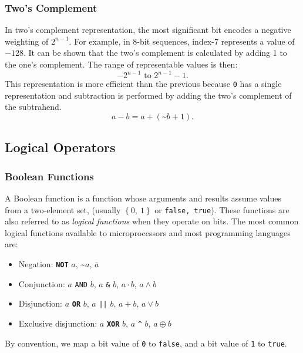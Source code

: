 \documentclass{article}
\newcommand{\keywordinline}[1]{\textcolor[rgb]{0.00,0.50,0.00}{\textbf{\texttt{#1}}}}
\begin{document}
\subsubsection{Two's Complement}
In two's complement representation, the most significant bit encodes a
negative weighting of \(2^{n - 1}\). For example, in 8-bit sequences,
index-7 represents a value of \(-128\). It can be shown that the two's
complement is calculated by adding 1 to the one's complement. The range
of representable values is then:
\begin{equation*}
    -2^{n - 1} \text{ to } 2^{n - 1} - 1.
\end{equation*}
This representation is more efficient than the previous because \texttt{0} has a single representation
and subtraction is performed by adding the two's complement of the subtrahend.
\begin{equation*}
    a - b = a + \left( \text{\textasciitilde} b + 1 \right).
\end{equation*}
\subsection{Logical Operators}
\subsubsection{Boolean Functions}
A Boolean function is a function whose arguments and results assume
values from a two-element set, (usually \(\left\{ 0,\: 1 \right\}\) or
\texttt{{false, true}}). These functions are also referred to
as \textit{logical functions} when they operate on bits. The most
common logical functions available to microprocessors and most
programming languages are:
\begin{itemize}
    \item Negation: \keywordinline{NOT} \(a\), \textasciitilde\(a\),
          \(\overline{a}\)
    \item Conjunction: \(a\) \texttt{AND} \(b\), \(a\)
          \texttt{&} \(b\), \(a \cdot b\), \(a \land b\)
    \item Disjunction: \(a\) \keywordinline{OR} \(b\), \(a\)
          \texttt{|\vert|} \(b\), \(a + b\), \(a \lor b\)
    \item Exclusive disjunction: \(a\) \keywordinline{XOR} \(b\), \(a\)
          \texttt{^} \(b\), \(a \oplus b\)
\end{itemize}
By convention, we map a bit value of \texttt{0} to \texttt{false}, and a bit value of \texttt{1} to \texttt{true}.
\end{document}
